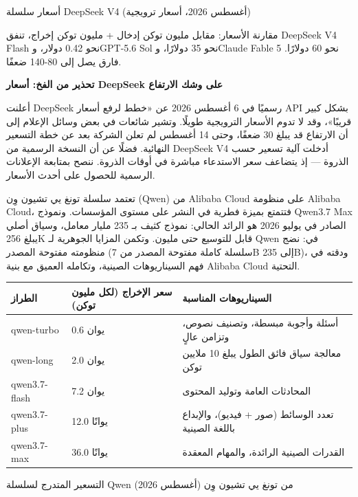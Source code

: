 \begin{center}\small\color{gray}أسعار سلسلة DeepSeek V4 (أغسطس 2026، أسعار ترويجية)\end{center}

مقارنة الأسعار: مقابل مليون توكن إدخال + مليون توكن إخراج، تنفق DeepSeek V4 Flash نحو 0.42 دولار، وGPT-5.6 Sol نحو 35 دولارًا، وClaude Fable 5 نحو 60 دولارًا. فارق يصل إلى 80-140 ضعفًا.

\textbf{تحذير من الفخ: أسعار DeepSeek على وشك الارتفاع}\par

أعلنت DeepSeek رسميًا في 6 أغسطس 2026 عن «خطط لرفع أسعار API بشكل كبير قريبًا»، وقد لا تدوم الأسعار الترويجية طويلًا. وتشير شائعات في بعض وسائل الإعلام إلى أن الارتفاع قد يبلغ 30 ضعفًا، وحتى 14 أغسطس لم تعلن الشركة بعد عن خطة التسعير النهائية. فضلًا عن أن النسخة الرسمية من DeepSeek V4 أدخلت آلية تسعير حسب الذروة — إذ يتضاعف سعر الاستدعاء مباشرة في أوقات الذروة. ننصح بمتابعة الإعلانات الرسمية للحصول على أحدث الأسعار.


تعتمد سلسلة تونغ يي تشيون وِن (Qwen) من Alibaba Cloud على منظومة Alibaba Cloud، فتتمتع بميزة فطرية في النشر على مستوى المؤسسات. ونموذج Qwen3.7 Max الصادر في يوليو 2026 هو الرائد الحالي: نموذج كثيف بـ 235 مليار معامل، وسياق أصلي يبلغ 256K قابل للتوسيع حتى مليون. وتكمن المزايا الجوهرية لـ Qwen في: نضج منظومته مفتوحة المصدر (سلسلة كاملة مفتوحة المصدر من 7B إلى 235B)، ودقته في فهم السيناريوهات الصينية، وتكامله العميق مع بنية Alibaba Cloud التحتية.

\begin{center}
\begin{tabularx}{\linewidth}{|X|X|X|}
\hline
\textbf{الطراز} & \textbf{سعر الإخراج (لكل مليون توكن)} & \textbf{السيناريوهات المناسبة} \tabularnewline
\hline
qwen-turbo & 0.6 يوان & أسئلة وأجوبة مبسطة، وتصنيف نصوص، وتزامن عالٍ \tabularnewline
qwen-long & 2.0 يوان & معالجة سياق فائق الطول يبلغ 10 ملايين توكن \tabularnewline
qwen3.7-flash & 7.2 يوان & المحادثات العامة وتوليد المحتوى \tabularnewline
qwen3.7-plus & 12.0 يوانًا & تعدد الوسائط (صور + فيديو)، والإبداع باللغة الصينية \tabularnewline
qwen3.7-max & 36.0 يوانًا & القدرات الصينية الرائدة، والمهام المعقدة \tabularnewline
\hline
\end{tabularx}
\end{center}

\begin{center}\small\color{gray}التسعير المتدرج لسلسلة Qwen من تونغ يي تشيون وِن (أغسطس 2026)\end{center}

